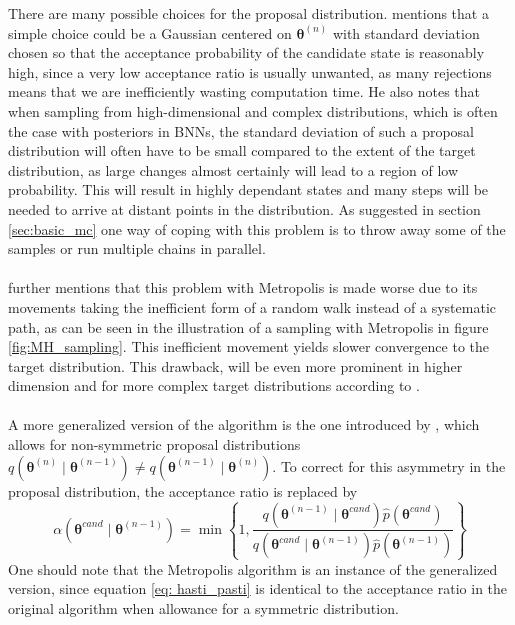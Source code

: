 There are many possible choices for the proposal distribution. \cite{neal2012bayesian} mentions that a simple choice could be a Gaussian centered on $\boldsymbol{\theta}^{(n)}$ with standard deviation chosen so that the acceptance probability of the candidate state is reasonably high, since a very low acceptance ratio is usually unwanted, as many rejections means that we are inefficiently wasting computation time. He also notes that when sampling from high-dimensional and complex distributions, which is often the case with posteriors in BNNs, the standard deviation of such a proposal distribution will often have to be small compared to the extent of the target distribution, as large changes almost certainly will lead to a region of low probability. This will result in highly dependant states and many steps will be needed to arrive at distant points in the distribution. As suggested in section \ref{sec:basic_mc} one way of coping with this problem is to throw away some of the samples or run multiple chains in parallel. \\
\\
\cite{neal2012bayesian} further mentions that this problem with Metropolis is made worse due to its movements taking the inefficient form of a random walk instead of a systematic path, as can be seen in the illustration of a sampling with Metropolis in figure \ref{fig:MH_sampling}. This inefficient movement yields slower convergence to the target distribution. This drawback, will be even more prominent in higher dimension and for more complex target distributions according to \cite{gelmanbda04}. \\
\\
A more generalized version of the algorithm is the one introduced by \cite{hastings70}, which allows for non-symmetric proposal distributions $q(\boldsymbol{\theta}^{(n)}\mid \boldsymbol{\theta}^{(n-1)}) \neq q(\boldsymbol{\theta}^{(n-1)}\mid \boldsymbol{\theta}^{(n)})$. To correct for this asymmetry in the proposal distribution, the acceptance ratio is replaced by
\begin{equation}\label{eq: hasti_pasti}
\alpha\left(\boldsymbol{\theta}^{c a n d} \mid \boldsymbol{\theta}^{(n-1)}\right)=\min \left\{1, \frac{q\left(\boldsymbol{\theta}^{(n-1)} \mid \boldsymbol{\theta}^{c a n d}\right) \hat{p}\left(\boldsymbol{\theta}^{c a n d}\right)}{q\left(\boldsymbol{\theta}^{c a n d} \mid \boldsymbol{\theta}^{(n-1)}\right) \hat{p}\left(\boldsymbol{\theta}^{(n-1)}\right)}\right\} 
\end{equation}
One should note that the Metropolis algorithm is an instance of the generalized version, since equation \ref{eq: hasti_pasti} is identical to the acceptance ratio in the original algorithm when allowance for a symmetric distribution. \\
